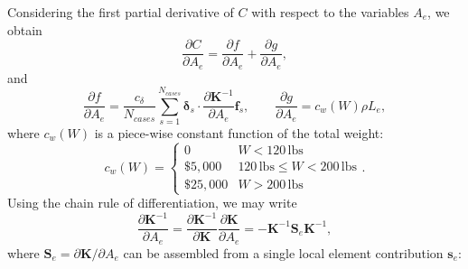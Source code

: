 \documentclass[12pt,a4paper,article]{memoir} %
\begin{document}
Considering the first partial derivative of $C$ with respect to the variables $A_e$, we obtain
\begin{equation}
	\frac{\partial C}{\partial A_e} = \frac{\partial f}{\partial A_e} + \frac{\partial g}{\partial A_e},
\end{equation}
and
\begin{equation}
	\frac{\partial f}{\partial A_e} = \frac{c_\delta}{N_{cases}} \sum_{s=1}^{N_{cases}} \boldsymbol{\delta}_s \cdot \frac{\partial \mathbf{K}^{-1}}{\partial A_e} \mathbf{f}_s, \qquad
	\frac{\partial g}{\partial A_e} = c_w (W) \rho L_e,
\end{equation}
where $c_w (W)$ is a piece-wise constant function of the total weight:
\begin{equation}
	c_w (W) = \left\{ \begin{array}{cc} 0 & W < 120 \, \text{lbs} \\ \text{\$}5,000 & 120 \, \text{lbs} \leq W < 200 \, \text{lbs} \\ \text{\$}25,000 & W > 200 \, \text{lbs} \end{array} \right. .
\end{equation}
Using the chain rule of differentiation, we may write
\begin{equation}
	\frac{\partial \mathbf{K}^{-1}}{\partial A_e} = \frac{\partial \mathbf{K}^{-1}}{\partial \mathbf{K}} \frac{\partial \mathbf{K}}{\partial A_e} = - \mathbf{K}^{-1} \mathbf{S}_e \mathbf{K}^{-1},
\end{equation}
where $\mathbf{S}_e = \partial \mathbf{K} / \partial A_e$ can be assembled from a single local element contribution $\mathbf{s}_e$:
\setlength\arraycolsep{-1pt}
\end{document}
